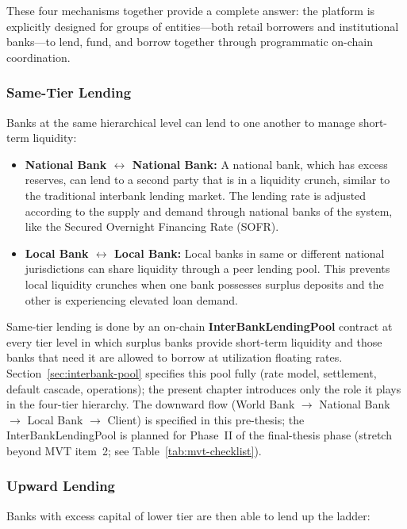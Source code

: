 \documentclass[12pt,a4paper]{report}
\begin{document}
These four mechanisms together provide a complete answer: the platform is explicitly designed for groups of entities---both retail borrowers and institutional banks---to lend, fund, and borrow together through programmatic on-chain coordination.

\subsubsection{Same-Tier Lending}

Banks at the same hierarchical level can lend to one another to manage short-term liquidity:

\begin{itemize}[noitemsep]
\item \textbf{National Bank $\leftrightarrow$ National Bank:} A national bank, which has excess reserves, can lend to a second party that is in a liquidity crunch, similar to the traditional interbank lending market. The lending rate is adjusted according to the supply and demand through national banks of the system, like the Secured Overnight Financing Rate (SOFR).
\item \textbf{Local Bank $\leftrightarrow$ Local Bank:} Local banks in same or different national jurisdictions can share liquidity through a peer lending pool. This prevents local liquidity crunches when one bank possesses surplus deposits and the other is experiencing elevated loan demand.
\end{itemize}

Same-tier lending is done by an on-chain \textbf{InterBankLendingPool} contract at every tier level in which surplus banks provide short-term liquidity and those banks that need it are allowed to borrow at utilization floating rates. Section~\ref{sec:interbank-pool} specifies this pool fully (rate model, settlement, default cascade, operations); the present chapter introduces only the role it plays in the four-tier hierarchy. The downward flow (World Bank $\to$ National Bank $\to$ Local Bank $\to$ Client) is specified in this pre-thesis; the InterBankLendingPool is planned for Phase~II of the final-thesis phase (stretch beyond MVT item~2; see Table~\ref{tab:mvt-checklist}).

\subsubsection{Upward Lending}

Banks with excess capital of lower tier are then able to lend up the ladder:
\end{document}
